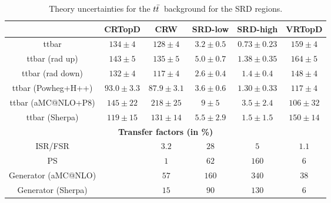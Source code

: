 \begin{description}
 \begin{table}[!h]
    \begin{center} \footnotesize
      \begin{tabular}{|c|c|c|c|c|c|}
        \hline
        & CRTopD & CRW & SRD-low & SRD-high & VRTopD\\
        \hline
        ttbar&   $134\pm 4 $&    $128\pm 4 $&    $3.2\pm 0.5 $&          $0.73\pm 0.23 $&        $159\pm 4 $\\
        ttbar (rad up)&          $143\pm 5 $&    $135\pm 5 $&    $5.0\pm 0.7 $&          $1.38\pm 0.35 $&        $164\pm 5 $\\
        ttbar (rad down)&        $132\pm 4 $&    $117\pm 4 $&    $2.6\pm 0.4 $&          $1.4\pm 0.4 $&          $148\pm 4 $\\
        ttbar (Powheg+H++)&      $93.0\pm 3.3 $&         $87.9\pm 3.1 $&         $3.6\pm 0.6 $&          $1.30\pm 0.33 $&        $117\pm 4 $\\
        ttbar (aMC@NLO+P8)&      $145\pm 22 $&   $218\pm 25 $&   $9\pm 5 $&      $3.5\pm 2.4 $&          $106\pm 32 $\\
        ttbar (Sherpa)&          $119\pm 15 $&   $131\pm 14 $&   $5.5\pm 2.9 $&          $1.5\pm 1.5 $&          $150\pm 14 $\\        
        \hline
        \multicolumn{6}{c}{\bf Transfer factors (in \%)} \\ \hline
        ISR/FSR &    &    $3.2$&          $28$&   $5$&    $1.1$\\
        PS &   &     $1$&    $62$&   $160$&          $6$\\
        Generator (aMC@NLO) &  &      $57$&   $160$&          $340$&          $38$\\
        Generator (Sherpa) &   &     $15$&   $90$&   $130$&          $6$\\        
        \hline       
        \end{tabular}
    \end{center}
    \caption{Theory uncertainties for the $t\bar{t}$\ background for the SRD regions.}
    \label{tab:ttbar_unc_SRD}
  \end{table} 


\end{description}

